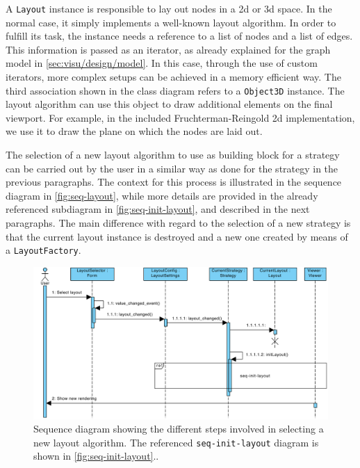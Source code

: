 A \texttt{Layout} instance is responsible to lay out nodes in a \gls{2d} or \gls{3d} space. In the normal case, it simply implements a well-known layout algorithm. In order to fulfill its task, the instance needs a reference to a list of nodes and a list of edges. This information is passed as an iterator, as already explained for the graph model in \vref{sec:visu/design/model}. In this case, through the use of custom iterators, more complex setups can be achieved in a memory efficient way. The third association shown in the class diagram refers to a \texttt{Object3D} instance. The layout algorithm can use this object to draw additional elements on the final viewport. For example, in the included Fruchterman-Reingold \gls{2d} implementation, we use it to draw the plane on which the nodes are laid out.

The selection of a new layout algorithm to use as building block for a strategy can be carried out by the user in a similar way as done for the strategy in the previous paragraphs. The context for this process is illustrated in the sequence diagram in \vref{fig:seq-layout}, while more details are provided in the already referenced subdiagram in \vref{fig:seq-init-layout}, and described in the next paragraphs. The main difference with regard to the selection of a new strategy is that the current layout instance is destroyed and a new one created by means of a \texttt{LayoutFactory}.

\begin{figure}
  \begin{adjustwidth}{-5.2mm}{-6.5mm}  
    \includegraphics[width=\linewidth]{images/diagrams/seq-layout}
  \end{adjustwidth}
    \caption[Sequence diagram for the layout selection process.]{Sequence diagram showing the different steps involved in selecting a new layout algorithm. The referenced \texttt{seq-init-layout} diagram is shown in \vref{fig:seq-init-layout}..}
  \label{fig:seq-layout}
\end{figure}

